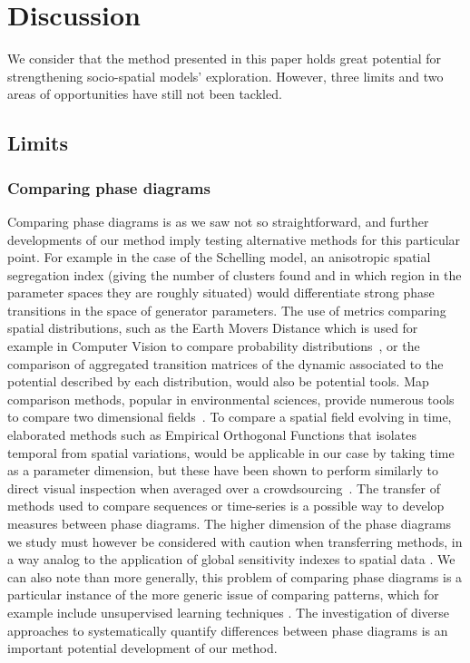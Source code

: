 \documentclass{JASSS}
\begin{document}
\section{Discussion}

We consider that the method presented in this paper holds great potential for strengthening socio-spatial models' exploration. However, three limits and two areas of opportunities have still not been tackled. 

\subsection{Limits}

\subsubsection{Comparing phase diagrams}

Comparing phase diagrams is as we saw not so straightforward, and further developments of our method imply testing alternative methods for this particular point. For example in the case of the Schelling model, an anisotropic spatial segregation index (giving the number of clusters found and in which region in the parameter spaces they are roughly situated) would differentiate strong phase transitions in the space of generator parameters. The use of metrics comparing spatial distributions, such as the Earth Movers Distance which is used for example in Computer Vision to compare probability distributions~\citep{rubner2000earth}, or the comparison of aggregated transition matrices of the dynamic associated to the potential described by each distribution, would also be potential tools. Map comparison methods, popular in environmental sciences, provide numerous tools to compare two dimensional fields~\citep{visser2006map,kuhnert2005comparing}. To compare a spatial field evolving in time, elaborated methods such as Empirical Orthogonal Functions that isolates temporal from spatial variations, would be applicable in our case by taking time as a parameter dimension, but these have been shown to perform similarly to direct visual inspection when averaged over a crowdsourcing~\citep{10.1371/journal.pone.0178165}. The transfer of methods used to compare sequences \citep{kruskal1983overview} or time-series \citep{liao2005clustering} is a possible way to develop measures between phase diagrams. The higher dimension of the phase diagrams we study must however be considered with caution when transferring methods, in a way analog to the application of global sensitivity indexes to spatial data \citep{lilburne2009sensitivity}. We can also note than more generally, this problem of comparing phase diagrams is a particular instance of the more generic issue of comparing patterns, which for example include unsupervised learning techniques \citep{hastie2009unsupervised}. The investigation of diverse approaches to systematically quantify differences between phase diagrams is an important potential development of our method.
\end{document}
